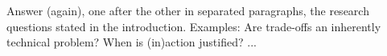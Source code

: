 Answer (again), one after the other in separated paragraphs, the research questions stated in the introduction.
Examples: Are trade-offs an inherently technical problem? When is (in)action justified? ...
